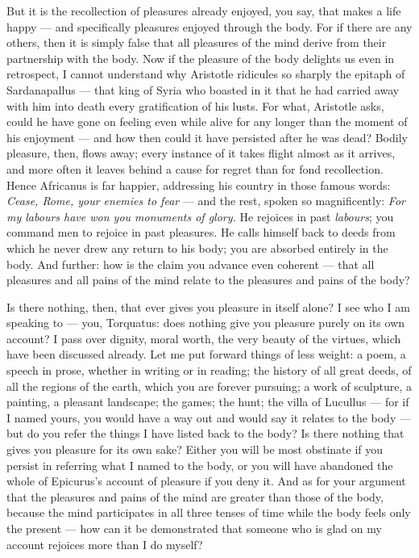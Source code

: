 But it is the recollection of pleasures already enjoyed, you say, that makes a life happy — and specifically pleasures enjoyed through the body. For if there are any others, then it is simply false that all pleasures of the mind derive from their partnership with the body. Now if the pleasure of the body delights us even in retrospect, I cannot understand why Aristotle ridicules so sharply the epitaph of Sardanapallus — that king of Syria who boasted in it that he had carried away with him into death every gratification of his lusts. For what, Aristotle asks, could he have gone on feeling even while alive for any longer than the moment of his enjoyment — and how then could it have persisted after he was dead? Bodily pleasure, then, flows away; every instance of it takes flight almost as it arrives, and more often it leaves behind a cause for regret than for fond recollection. Hence Africanus is far happier, addressing his country in those famous words: \textit{Cease, Rome, your enemies to fear} — and the rest, spoken so magnificently: \textit{For my labours have won you monuments of glory.} He rejoices in past \textit{labours}; you command men to rejoice in past pleasures. He calls himself back to deeds from which he never drew any return to his body; you are absorbed entirely in the body. And further: how is the claim you advance even coherent — that all pleasures and all pains of the mind relate to the pleasures and pains of the body?

Is there nothing, then, that ever gives you pleasure in itself alone? I see who I am speaking to — you, Torquatus: does nothing give you pleasure purely on its own account? I pass over dignity, moral worth, the very beauty of the virtues, which have been discussed already. Let me put forward things of less weight: a poem, a speech in prose, whether in writing or in reading; the history of all great deeds, of all the regions of the earth, which you are forever pursuing; a work of sculpture, a painting, a pleasant landscape; the games; the hunt; the villa of Lucullus — for if I named yours, you would have a way out and would say it relates to the body — but do you refer the things I have listed back to the body? Is there nothing that gives you pleasure for its own sake? Either you will be most obstinate if you persist in referring what I named to the body, or you will have abandoned the whole of Epicurus's account of pleasure if you deny it. And as for your argument that the pleasures and pains of the mind are greater than those of the body, because the mind participates in all three tenses of time while the body feels only the present — how can it be demonstrated that someone who is glad on my account rejoices more than I do myself?

